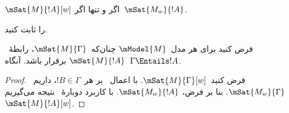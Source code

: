 \documentclass[../../../include/open-logic-section]{subfiles}
\begin{document}
\begin{prop}
  $\mSat{M}{!A}[w]$ اگر و تنها اگر~$\mSat{M_w}{!A}$.
\end{prop}

\begin{prob}
   را ثابت کنید.
\end{prob}

\begin{prop}
  فرض کنید برای هر مدل~$\mModel{M}$ چنان‌که~$\mSat{M}{\Gamma}$،
  رابطهٔ~$\mSat{M}{!A}$ برقرار باشد. آنگاه~$\Gamma \Entails !A$.
\end{prop}

\begin{proof}
  فرض کنید~$\mSat{M}{\Gamma}[w]$. با اعمال~ بر
  هر~$!B \in \Gamma$، داریم~$\mSat{M_w}{\Gamma}$. بنا بر فرض،
  $\mSat{M_w}{!A}$. با کاربرد دوبارهٔ~ نتیجه
  می‌گیریم~$\mSat{M}{!A}[w]$.
\end{proof}
\end{document}
